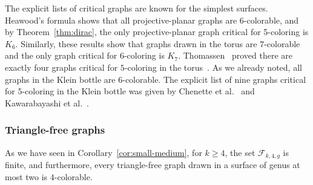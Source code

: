 \documentclass[12pt,twoside,openright,a4paper]{book}
\newcommand{\FF}{\mathcal{F}}
\begin{document}
The explicit lists of critical graphs are known for the simplest surfaces.  Heawood's formula shows
that all projective-planar graphs are 6-colorable, and by Theorem~\ref{thm:dirac}, the only
projective-planar graph critical for 5-coloring is $K_6$.  Similarly, these results show that
graphs drawn in the torus are $7$-colorable and the only graph critical for $6$-coloring is $K_7$.
Thomassen~\cite{Tho5torus} proved there are exactly four graphs critical for $5$-coloring in the torus~\cite{Tho5torus}.
As we already noted, all graphs in the Klein bottle are 6-colorable.  The explicit list of nine
graphs critical for $5$-coloring in the Klein bottle was given by Chenette et al.~\cite{ChePosStrThoYer}
and Kawarabayashi et al.~\cite{KawKraKynLid}.

\subsubsection*{Triangle-free graphs}

As we have seen in Corollary~\ref{cor:small-medium}, for $k\ge 4$, the set $\FF_{k,4,g}$ is finite,
and furthermore, every triangle-free graph drawn in a surface of genus at most two is $4$-colorable.
\end{document}
